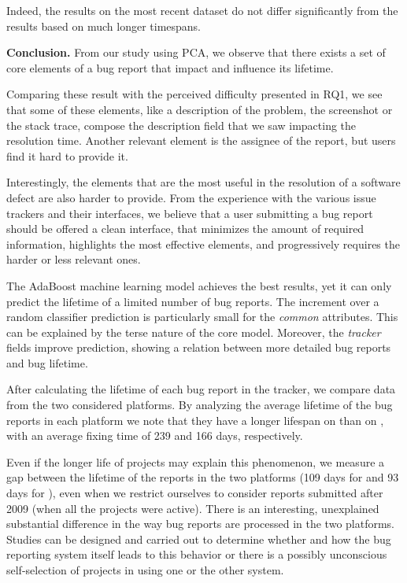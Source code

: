 Indeed, the results on the most recent dataset do not differ significantly from the results based on much longer timespans.

\textbf{Conclusion.} From our study using PCA, we observe that there exists a set of core elements of a bug report that impact and influence its lifetime. 

Comparing these result with the perceived difficulty presented in RQ1, we see that some of these elements, like a description of the problem, the screenshot or the stack trace, compose the description field that we saw impacting the resolution time. Another relevant element is the assignee of the report, but users find it hard to provide it. 

Interestingly, the elements that are the most useful in the resolution of a software defect are also harder to provide. From the experience with the various issue trackers and their interfaces, we believe that a user submitting a bug report should be offered a clean interface, that minimizes the amount of required information, highlights the most effective elements, and progressively requires the harder or less relevant ones.

The AdaBoost machine learning model achieves the best results, yet it can only predict the lifetime of a limited number of bug reports. The increment over a random classifier prediction is particularly small for the \emph{common} attributes. This can be explained by the terse nature of the core model. Moreover, the \emph{tracker} fields improve prediction, showing a relation between more detailed bug reports and bug lifetime.

After calculating the lifetime of each bug report in the tracker, we compare data from the two considered platforms. By analyzing the average lifetime of the bug reports in each platform we note that they have a longer lifespan on \bzilla than on \jira, with an average fixing time of 239 and 166 days, respectively. 

Even if the longer life of \bzilla projects may explain this phenomenon, we measure a gap between the lifetime of the reports in the two platforms (109 days for \bzilla and 93 days for \jira), even when we restrict ourselves to consider reports submitted after 2009 (\ie when all the projects were active). There is an interesting, unexplained substantial difference in the way bug reports are processed in the two platforms. Studies can be designed and carried out to determine whether and how the bug reporting system itself leads to this behavior or there is a possibly unconscious self-selection of projects in using one or the other system.

